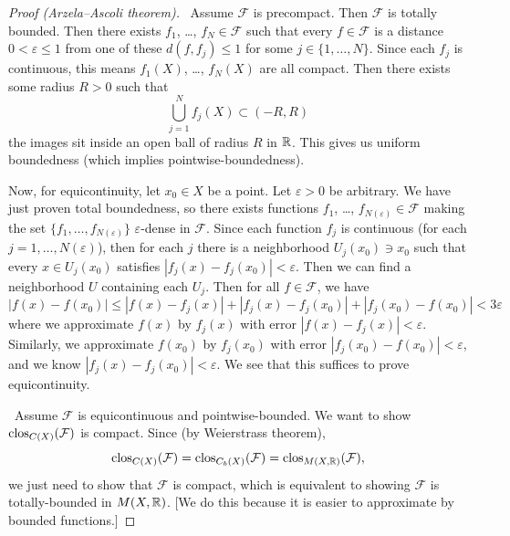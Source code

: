 \begin{proof}[Proof (Arzela--Ascoli theorem)]
\forwardproof\ Assume $\mathcal{F}$ is precompact. Then $\mathcal{F}$
is totally bounded. Then there exists $f_{1}$, \dots, $f_{N}\in\mathcal{F}$
such that every $f\in\mathcal{F}$ is a distance $0<\varepsilon\leq1$
from one of these $d(f,f_{j})\leq1$ for some
$j\in\{1,\dots,N\}$. Since each $f_{j}$ is continuous, this means
$f_{1}(X)$, \dots, $f_{N}(X)$ are all compact. Then there exists some
radius $R>0$ such that
\begin{equation}
\bigcup^{N}_{j=1}f_{j}(X)\subset(-R,R)
\end{equation}
the images sit inside an open ball of radius $R$ in $\mathbb{R}$. This gives
us uniform boundedness (which implies pointwise-boundedness).

Now, for equicontinuity, let $x_{0}\in X$ be a point. Let
$\varepsilon>0$ be arbitrary. We have just proven total boundedness,
so there exists functions $f_{1}$, \dots, $f_{N(\varepsilon)}\in\mathcal{F}$
making the set $\{f_{1},\dots,f_{N(\varepsilon)}\}$
$\varepsilon$-dense in $\mathcal{F}$. Since each function $f_{j}$ is
continuous (for each $j=1,\dots,N(\varepsilon)$), then for each $j$
there is a neighborhood $U_{j}(x_{0})\ni x_{0}$ such that every $x\in U_{j}(x_{0})$
satisfies $|f_{j}(x)-f_{j}(x_{0})|<\varepsilon$. Then we can find a
neighborhood $U$ containing each $U_{j}$. Then for all
$f\in\mathcal{F}$, we have
\begin{equation}
|f(x)-f(x_{0})|\leq|f(x)-f_{j}(x)|+|f_{j}(x)-f_{j}(x_{0})|+|f_{j}(x_{0})-f(x_{0})|<3\varepsilon
\end{equation}
where we approximate $f(x)$ by $f_{j}(x)$ with error
$|f(x)-f_{j}(x)|<\varepsilon$. Similarly, we approximate $f(x_{0})$ by
$f_{j}(x_{0})$ with error $|f_{j}(x_{0})-f(x_{0})|<\varepsilon$, and
we know $|f_{j}(x)-f_{j}(x_{0})|<\varepsilon$. We see that this
suffices to prove equicontinuity.

\backwardproof\ Assume $\mathcal{F}$ is equicontinuous and
pointwise-bounded. We want to show $\operatorname{clos}_{C(X)}(\mathcal{F})$ is
compact. Since (by Weierstrass theorem),
\begin{equation}
\operatorname{clos}_{C(X)}(\mathcal{F})=\operatorname{clos}_{C_{b}(X)}(\mathcal{F})=\operatorname{clos}_{M(X,\mathbb{R})}(\mathcal{F}),
\end{equation}
we just need to show that $\mathcal{F}$ is compact, which is
equivalent to showing $\mathcal{F}$ is totally-bounded in $M(X,\mathbb{R})$.
[We do this because it is easier to approximate by bounded functions.]


\end{proof}
